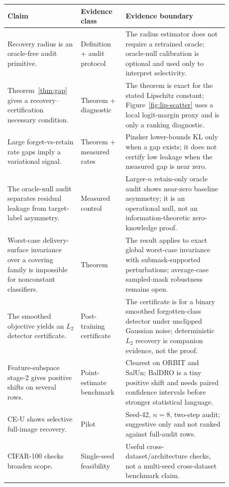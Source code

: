 \documentclass[11pt]{article}
\begin{document}
\begin{table}[t]
  \centering
  \small
  \setlength{\tabcolsep}{4pt}
  \begin{tabular}{p{0.28\linewidth} p{0.18\linewidth} p{0.42\linewidth}}
    \toprule
    Claim & Evidence class & Evidence boundary \\
    \midrule
    Recovery radius is an oracle-free audit primitive. & Definition + audit protocol & The radius estimator does not require a retrained oracle; oracle-null calibration is optional and used only to interpret selectivity. \\
    Theorem~\ref{thm:gap} gives a recovery--certification necessary condition. & Theorem + diagnostic & The theorem is exact for the stated Lipschitz constant; Figure~\ref{fig:lip-scatter} uses a local logit-margin proxy and is only a ranking diagnostic. \\
    Large forget-vs-retain rate gaps imply a variational signal. & Theorem + measured rates & Pinsker lower-bounds KL only when a gap exists; it does not certify low leakage when the measured gap is near zero. \\
    The oracle-null audit separates residual leakage from target-label asymmetry. & Measured control & Larger-$n$ retain-only oracle audit shows near-zero baseline asymmetry; it is an operational null, not an information-theoretic zero-knowledge proof. \\
    Worst-case delivery-surface invariance over a covering family is impossible for nonconstant classifiers. & Theorem & The result applies to exact global worst-case invariance with submask-supported perturbations; average-case sampled-mask robustness remains open. \\
    The smoothed objective yields an $L_2$ detector certificate. & Post-training certificate & The certificate is for a binary smoothed forgotten-class detector under unclipped Gaussian noise; deterministic $L_2$ recovery is companion evidence, not the proof. \\
    Feature-subspace stage-2 gives positive shifts on several rows. & Point-estimate benchmark & Clearest on ORBIT and SalUn; BalDRO is a tiny positive shift and needs paired confidence intervals before stronger statistical language. \\
    CE-U shows selective full-image recovery. & Pilot & Seed-42, $n=8$, two-step audit; suggestive only and not ranked against full-audit rows. \\
    CIFAR-100 checks broaden scope. & Single-seed feasibility & Useful cross-dataset/architecture checks, not a multi-seed cross-dataset benchmark claim. \\

\end{tabular}
\end{table}
\end{document}
